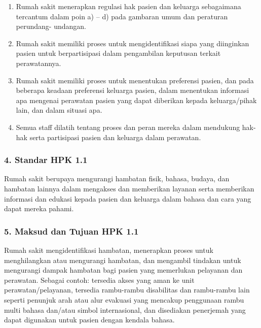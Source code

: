 \documentclass[
]{book}
\providecommand{\tightlist}{%
  \setlength{\itemsep}{0pt}\setlength{\parskip}{0pt}}
\begin{document}
\begin{enumerate}
\def\labelenumi{\alph{enumi}.}
\tightlist
\item
  Rumah sakit menerapkan regulasi hak pasien dan keluarga sebagaimana tercantum dalam poin a) -- d) pada gambaran umum dan peraturan perundang- undangan.
\item
  Rumah sakit memiliki proses untuk mengidentifikasi siapa yang diinginkan pasien untuk berpartisipasi dalam pengambilan keputusan terkait perawatannya.
\item
  Rumah sakit memiliki proses untuk menentukan preferensi pasien, dan pada beberapa keadaan preferensi keluarga pasien, dalam menentukan informasi apa mengenai perawatan pasien yang dapat diberikan kepada keluarga/pihak lain, dan dalam situasi apa.
\item
  Semua staff dilatih tentang proses dan peran mereka dalam mendukung hak-hak serta partisipasi pasien dan keluarga dalam perawatan.
\end{enumerate}

\hypertarget{standar-hpk-1.1}{%
\subsubsection*{4. Standar HPK 1.1}\label{standar-hpk-1.1}}

Rumah sakit berupaya mengurangi hambatan fisik, bahasa, budaya, dan hambatan lainnya dalam mengakses dan memberikan layanan serta memberikan informasi dan edukasi kepada pasien dan keluarga dalam bahasa dan cara yang dapat mereka pahami.

\hypertarget{maksud-dan-tujuan-hpk-1.1}{%
\subsubsection*{5. Maksud dan Tujuan HPK 1.1}\label{maksud-dan-tujuan-hpk-1.1}}

Rumah sakit mengidentifikasi hambatan, menerapkan proses untuk menghilangkan atau mengurangi hambatan, dan mengambil tindakan untuk mengurangi dampak hambatan bagi pasien yang memerlukan pelayanan dan perawatan. Sebagai contoh: tersedia akses yang aman ke unit perawatan/pelayanan, tersedia rambu-rambu disabilitas dan rambu-rambu lain seperti penunjuk arah atau alur evakuasi yang mencakup penggunaan rambu multi bahasa dan/atau simbol internasional, dan disediakan penerjemah yang dapat digunakan untuk pasien dengan kendala bahasa.
\end{document}
